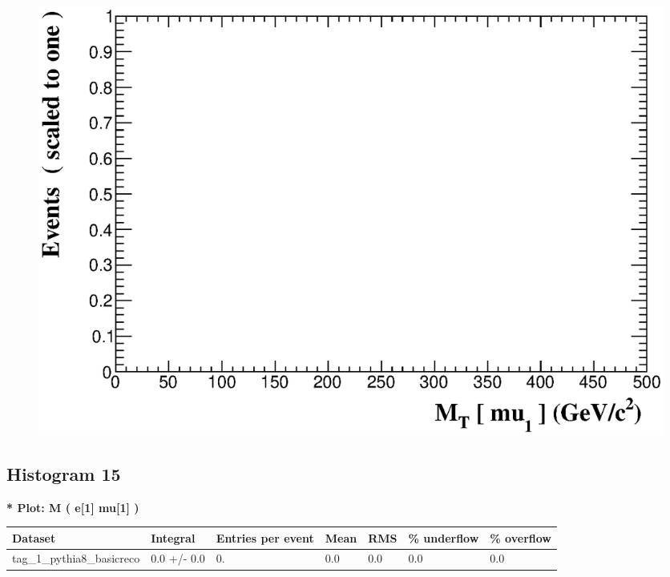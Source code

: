\documentclass[a4paper, 10pt]{article}
\begin{document}
\begin{figure}[H]
  \begin{center}
    \includegraphics[scale=0.45]{selection_13.eps}\\
\caption{   }
  \end{center}
\end{figure}
      \newpage
\subsection{ Histogram 15}

\textbf{* Plot: M ( e[1] mu[1] ) }\\
   \begin{table}[H]
  \begin{center}
    \begin{tabular}{|m{23.0mm}|m{23.0mm}|m{18.0mm}|m{19.0mm}|m{19.0mm}|m{19.0mm}|m{19.0mm}|}
      \hline
      {\cellcolor{yellow}         Dataset}& {\cellcolor{yellow}         Integral}& {\cellcolor{yellow}         Entries per event}& {\cellcolor{yellow}         Mean}& {\cellcolor{yellow}         RMS}& {\cellcolor{yellow}         \% underflow}& {\cellcolor{yellow}         \% overflow}\\
      \hline
      {\cellcolor{white}         tag\_1\_pythia8\_basicreco}& {\cellcolor{white}         0.0 +/\-- 0.0}& {\cellcolor{white}         0.}& {\cellcolor{white}         0.0}& {\cellcolor{white}         0.0}& {\cellcolor{green}         0.0}& {\cellcolor{green}         0.0}\\
\hline
    \end{tabular}
  \end{center}
\end{table}
\end{document}
